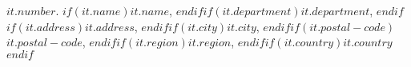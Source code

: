 $it.number$. $if(it.name)$$it.name$, $endif$$if(it.department)$$it.department$, $endif$$if(it.address)$$it.address$, $endif$$if(it.city)$$it.city$, $endif$$if(it.postal-code)$$it.postal-code$, $endif$$if(it.region)$$it.region$, $endif$$if(it.country)$$it.country$$endif$
